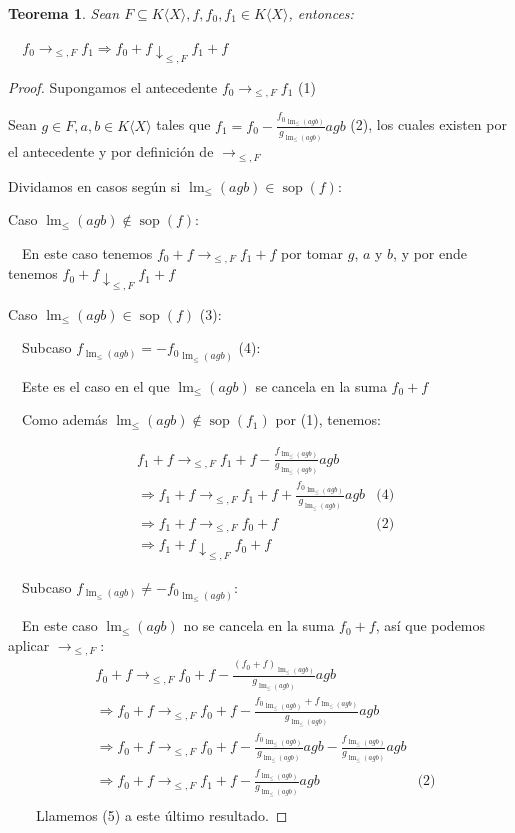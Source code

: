 \documentclass{amsbook}
\theoremstyle{customstyle}
\newtheorem{theorem}{Teorema}[section]
\DeclareMathOperator{\sop}{sop}
\DeclareMathOperator{\lm}{lm}
\begin{document}

\begin{theorem}\label{thm:suma →↓}
Sean $F ⊆ K⟨X⟩, f, f_0, f_1 ∈ K⟨X⟩$, entonces:

  $f_0 →_{≤, F} f_1 ⇒ f_0 + f ↓_{≤, F} f_1 + f$

\end{theorem}
\begin{proof}
Supongamos el antecedente $f_0 →_{≤, F} f_1$ (1)

Sean $g ∈ F, a, b ∈ K⟨X⟩$ tales que $f_1 = f_0 - \frac{{f_0}_{\lm_≤(agb)}}{g_{\lm_≤(agb)}} agb$ (2), los cuales existen por el antecedente y por definición de $→_{≤, F}$

Dividamos en casos según si $\lm_≤(agb) ∈ \sop(f)$:

Caso $\lm_≤(agb) ∉ \sop(f)$:

  En este caso tenemos $f_0 + f →_{≤, F} f_1 + f$ por tomar $g$, $a$ y $b$, y por ende tenemos $f_0 + f ↓_{≤, F} f_1 + f$


Caso $\lm_≤(agb) ∈ \sop(f)$ (3):

  Subcaso $f_{\lm_≤(agb)} = -{f_0}_{\lm_≤(agb)}$ (4):

  Este es el caso en el que $\lm_≤(agb)$ se cancela en la suma $f_0 + f$

  Como además $\lm_≤(agb) ∉ \sop(f_1)$ por (1), tenemos:

\begin{align*}
&f_1 + f →_{≤, F} f_1 + f - \frac{f_{\lm_≤(agb)}}{g_{\lm_≤(agb)}} agb &\\
& ⇒ f_1 + f →_{≤, F} f_1 + f + \frac{{f_0}_{\lm_≤(agb)}}{g_{\lm_≤(agb)}} agb & \text{(4)} \\
& ⇒ f_1 + f →_{≤, F} f_0 + f & \text{(2)} \\
& ⇒ f_1 + f ↓_{≤, F} f_0 + f &
\end{align*}

  Subcaso $f_{\lm_≤(agb)} ≠ -{f_0}_{\lm_≤(agb)}$:

  En este caso $\lm_≤(agb)$ no se cancela en la suma $f_0 + f$, así que podemos aplicar $→_{≤, F}$:
\begin{align*}
&f_0 + f →_{≤, F} f_0 + f - \frac{(f_0 + f)_{\lm_≤(agb)}}{g_{\lm_≤(agb)}} agb &\\
& ⇒ f_0 + f →_{≤, F} f_0 + f - \frac{{f_0}_{\lm_≤(agb)} + f_{\lm_≤(agb)}}{g_{\lm_≤(agb)}} agb &\\
& ⇒ f_0 + f →_{≤, F} f_0 + f - \frac{{f_0}_{\lm_≤(agb)}}{g_{\lm_≤(agb)}} agb - \frac{f_{\lm_≤(agb)}}{g_{\lm_≤(agb)}} agb &\\
& ⇒ f_0 + f →_{≤, F} f_1 + f - \frac{f_{\lm_≤(agb)}}{g_{\lm_≤(agb)}} agb &\text{(2)}\\
\end{align*}
    Llamemos (5) a este último resultado.


\end{proof}
\end{document}
